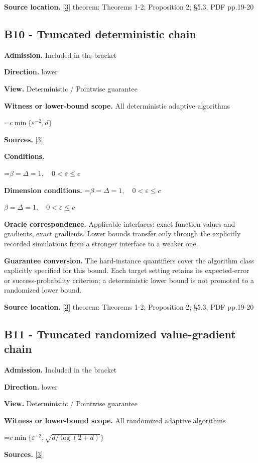 \documentclass[10pt,a4paper]{article}
\newcommand{\AtlasMath}[1]{\par\begingroup\centering\setbox0=\hbox{$\displaystyle #1$}\ifdim\wd0>1.4\linewidth\typeout{ATLAS WIDE FORMULA: \the\wd0}\fi\ifdim\wd0>\linewidth\resizebox{\linewidth}{!}{\box0}\else\box0\fi\par\endgroup}
\newcommand{\AtlasInlineMath}[1]{\begingroup\setbox0=\hbox{$#1$}\ifdim\wd0>.4\linewidth\endgroup\AtlasMath{#1}\else\endgroup$#1$\fi}
\begin{document}
\textbf{Source location.} \href{https://arxiv.org/pdf/1710.11606}{[3]} theorem: Theorems 1-2; Proposition 2; §5.3, PDF pp.19-20

\subsection{B10 - Truncated deterministic chain}
\textbf{Admission.} Included in the bracket

\textbf{Direction.} lower

\textbf{View.} Deterministic / Pointwise guarantee

\textbf{Witness or lower-bound scope.} All deterministic adaptive algorithms

\AtlasMath{c\min\{\varepsilon^{-2},d\}}
\textbf{Sources.} \href{https://arxiv.org/pdf/1710.11606}{[3]}

\textbf{Conditions.} 
\AtlasMath{\beta=\Delta=1,\quad0<\varepsilon\le c}


\textbf{Dimension conditions.} \AtlasInlineMath{\beta=\Delta=1,\quad0<\varepsilon\le c}

\textbf{Oracle correspondence.} Applicable interfaces: exact function values and gradients, exact gradients. Lower bounds transfer only through the explicitly recorded simulations from a stronger interface to a weaker one.

\textbf{Guarantee conversion.} The hard-instance quantifiers cover the algorithm class explicitly specified for this bound. Each target setting retains its expected-error or success-probability criterion; a deterministic lower bound is not promoted to a randomized lower bound.

\textbf{Source location.} \href{https://arxiv.org/pdf/1710.11606}{[3]} theorem: Theorems 1-2; Proposition 2; §5.3, PDF pp.19-20

\subsection{B11 - Truncated randomized value-gradient chain}
\textbf{Admission.} Included in the bracket

\textbf{Direction.} lower

\textbf{View.} Deterministic / Pointwise guarantee

\textbf{Witness or lower-bound scope.} All randomized adaptive algorithms

\AtlasMath{c\min\{\varepsilon^{-2},\sqrt{d/\log(2+d)}\}}
\textbf{Sources.} \href{https://arxiv.org/pdf/1710.11606}{[3]}
\end{document}
